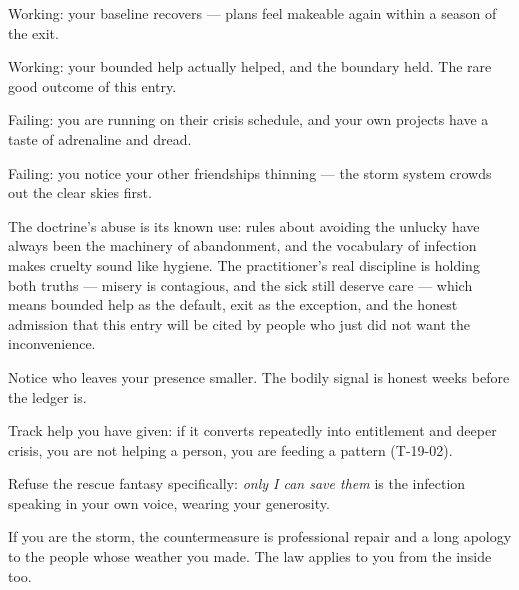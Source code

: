 \begin{feedback}
  \item Working: your baseline recovers --- plans feel makeable again within a season of the exit.
  \item Working: your bounded help actually helped, and the boundary held. The rare good outcome of this entry.
  \item Failing: you are running on their crisis schedule, and your own projects have a taste of adrenaline and dread.
  \item Failing: you notice your other friendships thinning --- the storm system crowds out the clear skies first.
\end{feedback}
\begin{failure}
The doctrine's abuse is its known use: rules about avoiding the unlucky have always been the machinery of abandonment, and the vocabulary of infection makes cruelty sound like hygiene. The practitioner's real discipline is holding both truths --- misery is contagious, and the sick still deserve care --- which means bounded help as the default, exit as the exception, and the honest admission that this entry will be cited by people who just did not want the inconvenience.
\end{failure}
\begin{countermeasures}
  \item Notice who leaves your presence smaller. The bodily signal is honest weeks before the ledger is.
  \item Track help you have given: if it converts repeatedly into entitlement and deeper crisis, you are not helping a person, you are feeding a pattern (T-19-02).
  \item Refuse the rescue fantasy specifically: \emph{only I can save them} is the infection speaking in your own voice, wearing your generosity.
  \item If you are the storm, the countermeasure is professional repair and a long apology to the people whose weather you made. The law applies to you from the inside too.
\end{countermeasures}

\seesources
{}
